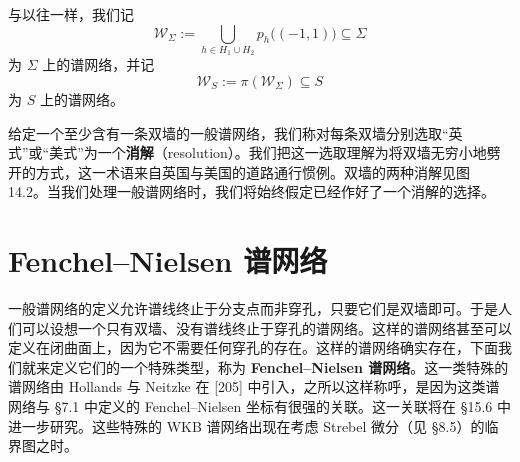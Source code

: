 

与以往一样，我们记
\[
\mathcal{W}_\Sigma:=\bigcup_{h\in H_1\cup H_2}p_h\big((-1,1)\big)\subseteq\Sigma
\]
为 $\Sigma$ 上的谱网络，并记
\[
\mathcal{W}_S:=\pi(\mathcal{W}_\Sigma)\subseteq S
\]
为 $S$ 上的谱网络。

给定一个至少含有一条双墙的一般谱网络，我们称对每条双墙分别选取“英式”或“美式”为一个\textbf{消解}（resolution）。我们把这一选取理解为将双墙无穷小地劈开的方式，这一术语来自英国与美国的道路通行惯例。双墙的两种消解见图 14.2。当我们处理一般谱网络时，我们将始终假定已经作好了一个消解的选择。


\section{Fenchel–Nielsen 谱网络}

一般谱网络的定义允许谱线终止于分支点而非穿孔，只要它们是双墙即可。于是人们可以设想一个只有双墙、没有谱线终止于穿孔的谱网络。这样的谱网络甚至可以定义在闭曲面上，因为它不需要任何穿孔的存在。这样的谱网络确实存在，下面我们就来定义它们的一个特殊类型，称为 \textbf{Fenchel–Nielsen 谱网络}。这一类特殊的谱网络由 Hollands 与 Neitzke 在 [205] 中引入，之所以这样称呼，是因为这类谱网络与 §7.1 中定义的 Fenchel–Nielsen 坐标有很强的关联。这一关联将在 §15.6 中进一步研究。这些特殊的 WKB 谱网络出现在考虑 Strebel 微分（见 §8.5）的临界图之时。

